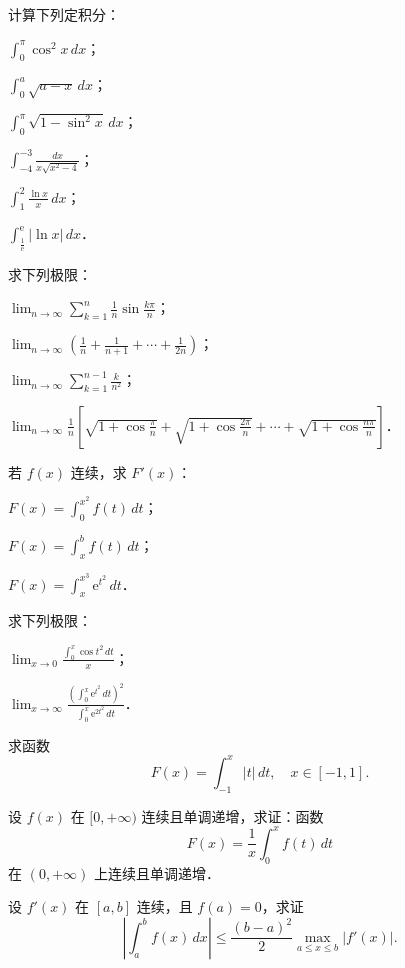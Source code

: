 \begin{xiti}
\item 计算下列定积分：
\begin{ziti}
\item $\displaystyle \int_0^\pi \cos^2 x \, dx$；
\item $\displaystyle \int_0^a \sqrt{a - x} \, dx$；
\item $\displaystyle \int_0^\pi \sqrt{1 - \sin^2 x} \, dx$；
\item $\displaystyle \int_{-4}^{-3}\frac{dx}{x\sqrt{x^2 - 4}}$；
\item $\displaystyle \int_1^2 \frac{\ln x}{x} \, dx$；
\item $\displaystyle \int_{\frac{1}{\mathrm{e}}}^{\mathrm{e}} |\ln x| \, dx$．
\end{ziti}

\item 求下列极限：
\begin{ziti}
\item $\displaystyle \lim_{n \to \infty} \sum_{k=1}^n \frac{1}{n} \sin \frac{k\pi}{n}$；
\item $\displaystyle \lim_{n \to \infty}\left(\frac{1}{n} + \frac{1}{n+1} + \cdots + \frac{1}{2n}\right)$；
\item $\displaystyle \lim_{n \to \infty} \sum_{k=1}^{n-1} \frac{k}{n^2}$；
\item $\displaystyle \lim_{n \to \infty} \frac{1}{n} \left[ \sqrt{1 + \cos \frac{\pi}{n}} + \sqrt{1 + \cos \frac{2\pi}{n}} + \cdots + \sqrt{1 + \cos \frac{n\pi}{n}} \right]$．
\end{ziti}

\item 若 $f(x)$ 连续，求 $F'(x)$：
\begin{ziti}
\item $\displaystyle F(x) = \int_0^{x^2} f(t) \, dt$；
\item $\displaystyle F(x) = \int_x^b f(t) \, dt$；
\item $\displaystyle F(x) = \int_x^{x^3} \mathrm{e}^{t^2} \, dt$．
\end{ziti}

\item 求下列极限：
\begin{ziti}
\item $\displaystyle \lim_{x \to 0} \frac{\int_0^x \cos t^2 \, dt}{x}$；
\item $\displaystyle \lim_{x \to \infty} \frac{\left( \int_0^x \mathrm{e}^{t^2} \, dt \right)^2}{\int_0^x \mathrm{e}^{2t^2} \, dt}$．
\end{ziti}

\item 求函数
\[
F(x) = \int_{-1}^x |t|\,dt, \quad x \in [-1,1].
\]

\item 设 $f(x)$ 在 $[0, +\infty)$ 连续且单调递增，求证：函数
\[
F(x) = \frac{1}{x}\int_0^x f(t)\,dt
\]
在 $(0, +\infty)$ 上连续且单调递增．

\item 设 $f'(x)$ 在 $[a,b]$ 连续，且 $f(a) = 0$，求证
\[
\left|\int_a^b f(x)\,dx\right| \leqslant \frac{(b-a)^2}{2}\max_{a \leqslant x \leqslant b}|f'(x)|.
\]
\end{xiti}
